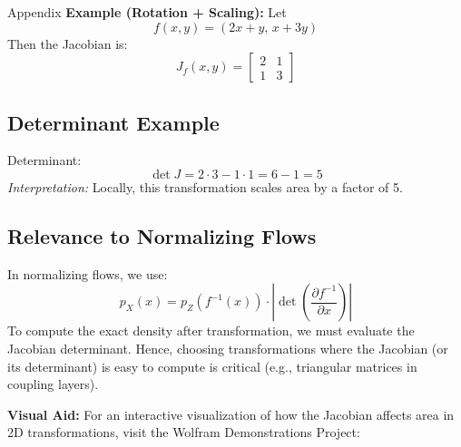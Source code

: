 \begin{frame}[allowframebreaks]{Appendix}
    \vspace{0.5em}
    \textbf{Example (Rotation + Scaling):} Let
    \[
    f(x, y) = (2x + y,\, x + 3y)
    \]
    Then the Jacobian is:
    \[
    J_f(x, y) =
    \begin{bmatrix}
    2 & 1 \\
    1 & 3
    \end{bmatrix}
    \]

    \subsection{Determinant Example}
    \label{subsec:appendix-jacobian-determinant}
    Determinant:
    \[
    \det J = 2 \cdot 3 - 1 \cdot 1 = 6 - 1 = 5
    \]
    \textit{Interpretation:} Locally, this transformation scales area by a factor of 5.

    \subsection{Relevance to Normalizing Flows}
    \label{subsec:appendix-jacobian-flows}
    In normalizing flows, we use:
    \[
    p_X(x) = p_Z(f^{-1}(x)) \cdot \left| \det \left( \frac{\partial f^{-1}}{\partial x} \right) \right|
    \]
    To compute the exact density after transformation, we must evaluate the Jacobian determinant. Hence, choosing transformations where the Jacobian (or its determinant) is easy to compute is critical (e.g., triangular matrices in coupling layers).

    \vspace{0.5em}
    \textbf{Visual Aid:} For an interactive visualization of how the Jacobian affects area in 2D transformations, visit the Wolfram Demonstrations Project:
    \begin{center}
      \href{https://demonstrations.wolfram.com/2DJacobian/}{}
    \end{center}    
\end{frame}